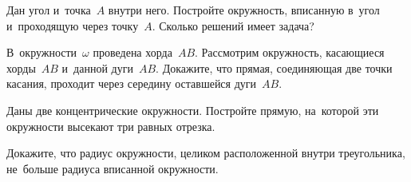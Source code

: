 \begin{problems}
\item
Дан угол и~точка~$A$ внутри него.
Постройте окружность, вписанную в~угол и~проходящую через точку~$A$.
Сколько решений имеет задача?

\item{}
В~окружности~$\omega$ проведена хорда~$AB$.
Рассмотрим окружность, касающиеся хорды~$AB$ и~данной дуги~$AB$.
Докажите, что прямая, соединяющая две точки касания, проходит через середину
оставшейся дуги~$AB$.

\item
Даны две концентрические окружности.
Постройте прямую, на~которой эти окружности высекают три равных отрезка.

\item
Докажите, что радиус окружности, целиком расположенной внутри треугольника,
не~больше радиуса вписанной окружности.

\end{problems}

